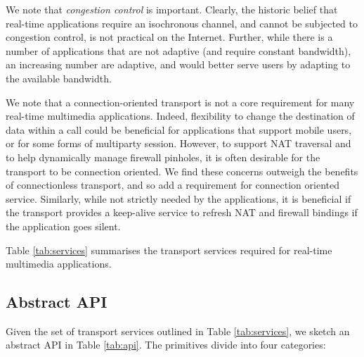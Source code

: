\documentclass[10pt]{sig-alternate-05-2015}
\begin{document}
We note that \emph{congestion control} is important. Clearly, the historic
belief that real-time applications require an isochronous channel, and
cannot be subjected to congestion control, is not practical on the
Internet. Further, while there is a number of applications that are not
adaptive (and require constant bandwidth), an increasing number are
adaptive, and would better serve users by adapting to the available
bandwidth.

We note that a connection-oriented transport is not a core requirement for
many real-time multimedia applications.  Indeed, flexibility to change the
destination of data within a call could be beneficial for applications that
support mobile users, or for some forms of multiparty session. However, to
support NAT traversal and to help dynamically manage firewall pinholes, it
is often desirable for the transport to be connection oriented. We find
these concerns outweigh the benefits of connectionless transport, and so
add a requirement for connection oriented service.
Similarly, while not strictly needed by the applications, it is beneficial
if the transport provides a keep-alive service to refresh NAT and firewall
bindings if the application goes silent.

Table \ref{tab:services} summarises the transport services required for
real-time multimedia applications.

\subsection{Abstract API}

Given the set of transport services outlined in Table \ref{tab:services},
we sketch an abstract API in  Table \ref{tab:api}. The primitives divide
into four categories:
\end{document}
